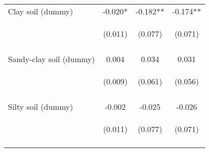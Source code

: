 \begin{center}
\begin{tabular}{lccc}
Clay soil (dummy) & -0.020* & -0.182** & -0.174** \\
 & \begin{footnotesize}(0.011)\end{footnotesize} & \begin{footnotesize}(0.077)\end{footnotesize} & \begin{footnotesize}(0.071)\end{footnotesize} \\
\vspace{4pt} & \begin{footnotesize}[0.079]\end{footnotesize} & \begin{footnotesize}[0.018]\end{footnotesize} & \begin{footnotesize}[0.014]\end{footnotesize} \\
Sandy-clay soil (dummy) & 0.004 & 0.034 & 0.031 \\
 & \begin{footnotesize}(0.009)\end{footnotesize} & \begin{footnotesize}(0.061)\end{footnotesize} & \begin{footnotesize}(0.056)\end{footnotesize} \\
\vspace{4pt} & \begin{footnotesize}[0.675]\end{footnotesize} & \begin{footnotesize}[0.579]\end{footnotesize} & \begin{footnotesize}[0.576]\end{footnotesize} \\
Silty soil (dummy) & -0.002 & -0.025 & -0.026 \\
 & \begin{footnotesize}(0.011)\end{footnotesize} & \begin{footnotesize}(0.077)\end{footnotesize} & \begin{footnotesize}(0.071)\end{footnotesize} \\
\vspace{4pt} & \begin{footnotesize}[0.848]\end{footnotesize} & \begin{footnotesize}[0.747]\end{footnotesize} & \begin{footnotesize}[0.716]\end{footnotesize} \\

\end{tabular}
\end{center}
